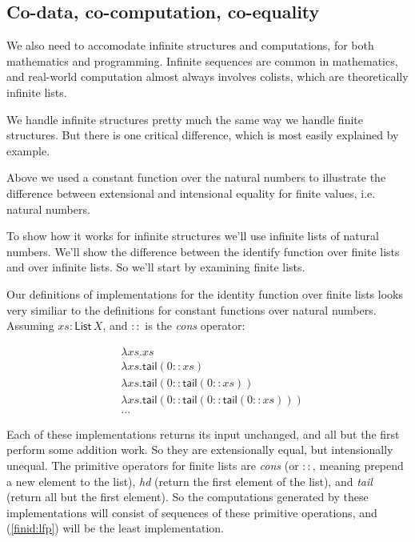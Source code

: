 \documentclass{article}
\begin{document}
\subsection{Co-data, co-computation, co-equality}

We also need to accomodate infinite structures and computations, for
both mathematics and programming. Infinite sequences are common in
mathematics, and real-world computation almost always involves
colists, which are theoretically infinite lists.

We handle infinite structures pretty much the same way we handle
finite structures. But there is one critical difference, which is most
easily explained by example.

Above we used a constant function over the natural numbers to
illustrate the difference between extensional and intensional
equality for finite values, i.e. natural numbers.

To show how it works for infinite structures we'll use infinite lists
of natural numbers. We'll show the difference between the identify
function over finite lists and over infinite lists. So we'll start by
examining finite lists.

Our definitions of implementations for the identity function over
finite lists looks very similiar to the definitions for constant
functions over natural numbers. Assuming \(xs:\textsf{List}\,X\), and
\(::\) is the \textit{cons} operator:

\begin{align}
  & \lambda xs.xs \label{finid:lfp} \\
  & \lambda xs.\textsf{tail}(0::xs) \\
  & \lambda xs.\textsf{tail}(0::\textsf{tail}(0::xs) \label{finid:1}) \\
  & \lambda xs.\textsf{tail}(0::\textsf{tail}(0::\textsf{tail}(0::xs) \label{finid:2})) \\
  & ... \nonumber
\end{align}

Each of these implementations returns its input unchanged, and all but
the first perform some addition work. So they are extensionally equal,
but intensionally unequal. The primitive operators for finite lists
are \textit{cons} (or \(::\), meaning prepend a new element to the list),
\textit{hd} (return the first element of the list), and \textit{tail}
(return all but the first element). So the computations generated by
these implementations will consist of sequences of these primitive
operations, and (\ref{finid:lfp}) will be the least implementation.
\end{document}
